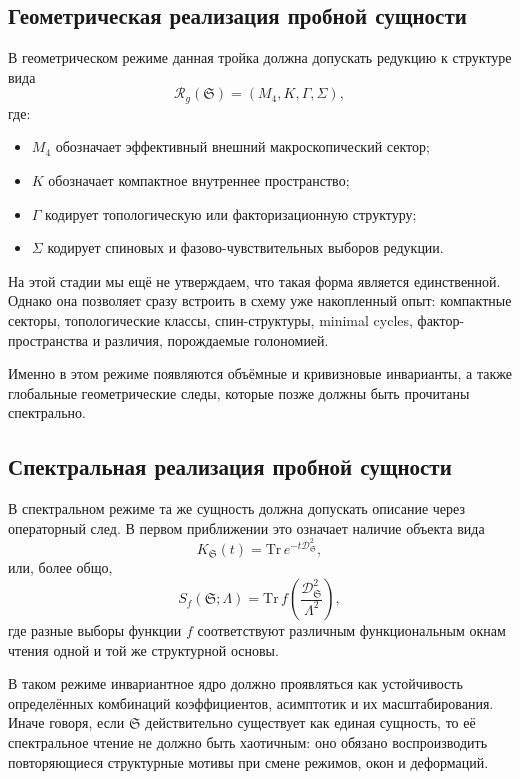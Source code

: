 \documentclass[12pt,a4paper]{article}
\begin{document}
\subsection{Геометрическая реализация пробной сущности}

В геометрическом режиме данная тройка должна допускать редукцию к структуре вида
\begin{equation}
\mathcal{R}_g(\mathfrak{S}) = (M_4, K, \Gamma, \Sigma),
\end{equation}
где:
\begin{itemize}
    \item \(M_4\) обозначает эффективный внешний макроскопический сектор;
    \item \(K\) обозначает компактное внутреннее пространство;
    \item \(\Gamma\) кодирует топологическую или факторизационную структуру;
    \item \(\Sigma\) кодирует спиновых и фазово-чувствительных выборов редукции.
\end{itemize}

На этой стадии мы ещё не утверждаем, что такая форма является единственной. Однако она позволяет сразу встроить в схему уже накопленный опыт: компактные секторы, топологические классы, спин-структуры, minimal cycles, фактор-пространства и различия, порождаемые голономией.

Именно в этом режиме появляются объёмные и кривизновые инварианты, а также глобальные геометрические следы, которые позже должны быть прочитаны спектрально.

\subsection{Спектральная реализация пробной сущности}

В спектральном режиме та же сущность должна допускать описание через операторный след. В первом приближении это означает наличие объекта вида
\begin{equation}
K_{\mathfrak{S}}(t)=\mathrm{Tr}\,e^{-t\mathcal{D}_{\mathfrak{S}}^2},
\end{equation}
или, более общо,
\begin{equation}
S_f(\mathfrak{S};\Lambda)=\mathrm{Tr}\,f\!\left(\frac{\mathcal{D}_{\mathfrak{S}}^2}{\Lambda^2}\right),
\end{equation}
где разные выборы функции \(f\) соответствуют различным функциональным окнам чтения одной и той же структурной основы.

В таком режиме инвариантное ядро должно проявляться как устойчивость определённых комбинаций коэффициентов, асимптотик и их масштабирования. Иначе говоря, если \(\mathfrak{S}\) действительно существует как единая сущность, то её спектральное чтение не должно быть хаотичным: оно обязано воспроизводить повторяющиеся структурные мотивы при смене режимов, окон и деформаций.
\end{document}
